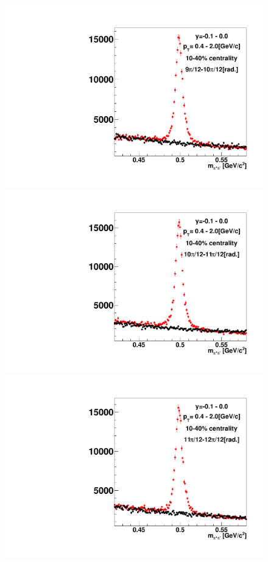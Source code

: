 \begin{figure}[h]
\includegraphics[width=0.14\linewidth]{chapterX/fig/ks_v1_sig/kf_ptslice0_cent1_ks_flow_phi10_rap5_check.pdf}
\includegraphics[width=0.14\linewidth]{chapterX/fig/ks_v1_sig/kf_ptslice0_cent1_ks_flow_phi11_rap5_check.pdf}
\includegraphics[width=0.14\linewidth]{chapterX/fig/ks_v1_sig/kf_ptslice0_cent1_ks_flow_phi12_rap5_check.pdf}


\end{figure}
